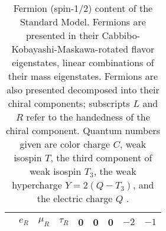 \begin{table}[p]
\begin{tabular}{cccc|ccccc}
                      &
    $e_R$    &
    $\mu_R$  &
    $\tau_R$ &
    0 & 0 & 0 & $-2$ & $-1$ \\[.2em]
    \hline
  \end{tabular}
  \caption[Fermion (spin-1/2) content of the Standard Model]{Fermion (spin-1/2) content of the Standard Model. Fermions are presented in their \mbox{Cabbibo-Kobayashi-Maskawa}-rotated flavor eigenstates, linear combinations of their mass eigenstates. Fermions are also presented decomposed into their chiral components; subscripts $L$ and $R$ refer to the handedness of the chiral component. Quantum numbers given are color charge $C$, weak isospin $T$, the third component of weak isospin $T_3$, the weak hypercharge $Y = 2(Q-T_3)$, and the electric charge $Q$ \cite{Srednicki, PDG:Electroweak}.}
  \label{tab:sm:fermions}
\end{table}

